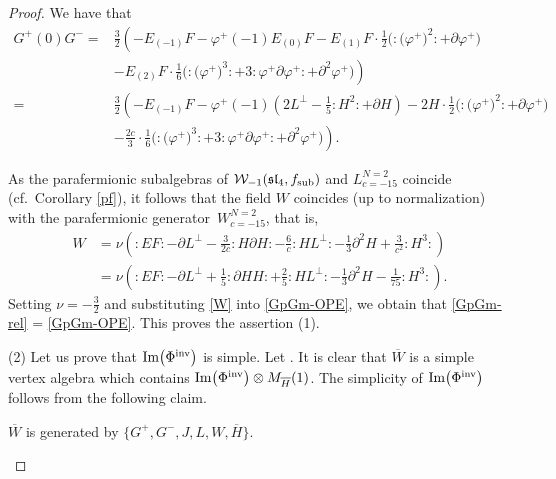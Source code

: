 \begin{proof}
We have that
 \begin{align}
G^+(0) G^-={}& \frac{3}{2}\left(-E_{(-1)}F -\varphi^+(-1) E_{(0)}F - E_{(1)}F\cdot \frac{1}{2}\bigl({:}\bigl(\varphi^+\bigr)^2{:}+\partial \varphi^+\bigr) \right. \nonumber\\
&\left. - E_{(2)}F\cdot \frac{1}{6}\bigl({:} \bigl(\varphi^+ \bigr)^3 {:}+3{:}\varphi ^+ \partial \varphi^+{:} + \partial ^2 \varphi^+\bigr) \right) \nonumber\\
={}& \frac{3}{2}\left(-E_{(-1)}F -\varphi^+(-1) \left(2L^{\perp} - \frac{1}{5}{:}H^2{:} +\partial H\right) - 2H\cdot\frac{1}{2}\bigl({:}\bigl(\varphi^+\bigr)^2{:}+\partial \varphi^+\bigr) \right. \nonumber\\
&\left.- \frac{2c}{3}\cdot \frac{1}{6}\bigl({:}\bigl(\varphi^+\bigr)^3{:} + 3{:}\varphi^+ \partial \varphi^+{:} + \partial ^2 \varphi^+\bigr) \right) .  \label{GpGm-rel}
\end{align}




As the parafermionic subalgebras of $\mathcal W_{-1} (\mathfrak{sl}_4, f_{\rm sub})$ and $L^{N=2}_{c=-15} $ coincide (cf.\ Corollary \ref{pf}), it follows that the field $W$ coincides (up to normalization) with the parafermionic generator~$W^{N=2}_{c=-15}$, that is,
\begin{align}
	W	&= \nu \left({:}E F{:} - \partial L^{\perp} - \frac{3}{2c}{:}H\partial H{:} -\frac{6}{c}{:}HL^{\perp}{:}- \frac{1}{3}\partial^2H + \frac{3}{c^2}{:}H^3{:} \right) \nonumber \\
	&= \nu \left({:}E F{:} - \partial L^{\perp}+ \frac{1}{5}{:}\partial H H {:} + \frac{2}{5}{:}HL^{\perp}{:} -\frac{1}{3}\partial^2H - \frac{1}{75}{:}H^3{:} \right). \label{W}
\end{align}
Setting $\nu = -\frac{3}{2}$ and substituting \eqref{W} into \eqref{GpGm-OPE}, we obtain that \eqref{GpGm-rel} = \eqref{GpGm-OPE}.
This proves the assertion (1).

(2) Let us prove that $\operatorname{Im} \bigl(\Phi^{\rm inv}\bigr) $ is simple. Let . It is clear that $\overline{W}$ is a simple vertex algebra which contains $ \operatorname{Im} \bigl(\Phi^{\rm inv}\bigr) \otimes M_{\overline{H}} (1)$. The simplicity of $ \operatorname{Im} \bigl(\Phi^{\rm inv}\bigr) $ follows from the following claim.

\begin{Claim}\label{Claim2}
$\overline W$ is generated by $\big\{ G^+, G^-, J, L, W, \overline{H} \big\}$.
\end{Claim}


\end{proof}
